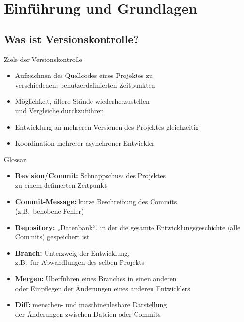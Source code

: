 \section{Einführung und Grundlagen}

\subsection{Was ist Versionskontrolle?}

\begin{frame}{Ziele der Versionskontrolle}
\begin{itemize}
	\item Aufzeichnen des Quellcodes eines Projektes zu\\verschiedenen, benutzerdefinierten Zeitpunkten
	\item Möglichkeit, ältere Stände wiederherzustellen\\und Vergleiche durchzuführen
	\item Entwicklung an mehreren Versionen des Projektes gleichzeitig
	\item Koordination mehrerer asynchroner Entwickler
\end{itemize}
\end{frame}

\begin{frame}{Glossar}
\begin{itemize}
	\item \textbf{Revision\slash Commit:} Schnappschuss des Projektes\\zu einem definierten Zeitpunkt
	\item \textbf{Commit-Message:} kurze Beschreibung des Commits\\(z.B.\ behobene Fehler)
	\item \textbf{Repository:} „Datenbank“, in der die gesamte Entwicklungsgeschichte (alle Commits) gespeichert ist
	\item \textbf{Branch:} Unterzweig der Entwicklung,\\z.B.\ für Abwandlungen des selben Projekts
	\item \textbf{Mergen:} Überführen eines Branches in einen anderen\\oder Einpflegen der Änderungen eines anderen Entwicklers
	\item \textbf{Diff:} menschen- und maschinenlesbare Darstellung\\der Änderungen zwischen Dateien oder Commits
\end{itemize}
\end{frame}

